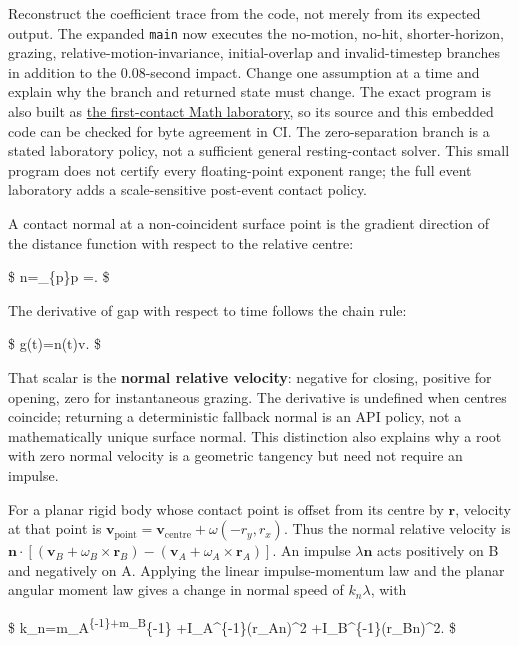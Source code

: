 Reconstruct the coefficient trace from the code, not merely from its expected output. The expanded \texttt{main} now executes the no-motion, no-hit, shorter-horizon, grazing, relative-motion-invariance, initial-overlap and invalid-timestep branches in addition to the 0.08-second impact. Change one assumption at a time and explain why the branch and returned state must change. The exact program is also built as \hyperref[source-file-c54e3c362767ccd1911378ae]{the first-contact Math laboratory}, so its source and this embedded code can be checked for byte agreement in CI. The zero-separation branch is a stated laboratory policy, not a sufficient general resting-contact solver. This small program does not certify every floating-point exponent range; the full event laboratory adds a scale-sensitive post-event contact policy.

A contact normal at a non-coincident surface point is the gradient direction of the distance function with respect to the relative centre:

\$ \mathbf n=\nabla\_\{\mathbf p\}\textbar{}\mathbf p\textbar{} =. \$

The derivative of gap with respect to time follows the chain rule:

\$ \dot g(t)=\mathbf n(t)\cdot\mathbf v. \$

That scalar is the \textbf{normal relative velocity}: negative for closing, positive for opening, zero for instantaneous grazing. The derivative is undefined when centres coincide; returning a deterministic fallback normal is an API policy, not a mathematically unique surface normal. This distinction also explains why a root with zero normal velocity is a geometric tangency but need not require an impulse.

For a planar rigid body whose contact point is offset from its centre by \(\mathbf r\), velocity at that point is \(\mathbf v_{\text{point}}=\mathbf v_{\text{centre}}+\omega(-r_y,r_x)\). Thus the normal relative velocity is \(\mathbf n\cdot[(\mathbf v_B+\omega_B\times\mathbf r_B)-(\mathbf v_A+\omega_A\times\mathbf r_A)]\). An impulse \(\lambda\mathbf n\) acts positively on B and negatively on A. Applying the linear impulse-momentum law and the planar angular moment law gives a change in normal speed of \(k_n\lambda\), with

\$ k\_n=m\_A\textsuperscript{\{-1\}+m\_B}\{-1\} +I\_A\^{}\{-1\}(\mathbf r\_A\times\mathbf n)\^{}2 +I\_B\^{}\{-1\}(\mathbf r\_B\times\mathbf n)\^{}2. \$

